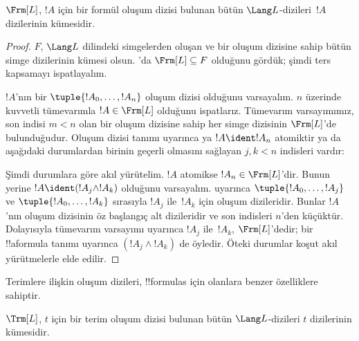 \documentclass[../../../include/open-logic-section]{subfiles}
\begin{document}
\begin{thm}
$\Frm[L]$, $!A$ için bir formül oluşum dizisi bulunan bütün $\Lang
L$-dizileri~$!A$ dizilerinin kümesidir.
\end{thm}

\begin{proof}
$F$, $\Lang L$ dilindeki simgelerden oluşan ve bir oluşum dizisine sahip
bütün simge dizilerinin kümesi olsun. 'da
$\Frm[L] \subseteq F$ olduğunu gördük; şimdi ters kapsamayı ispatlayalım.

$!A$'nın bir $\tuple{!A_0,\dotsc,!A_n}$ oluşum dizisi olduğunu
varsayalım. $n$ üzerinde kuvvetli tümevarımla $!A \in \Frm[L]$ olduğunu
ispatlarız. Tümevarım varsayımımız, son indisi $m < n$ olan bir oluşum
dizisine sahip her simge dizisinin $\Frm[L]$'de bulunduğudur. Oluşum
dizisi tanımı uyarınca ya $!A \ident !A_n$ atomiktir ya da aşağıdaki
durumlardan birinin geçerli olmasını sağlayan $j,k < n$ indisleri vardır:
\begin{enumerate}
\end{enumerate}
Şimdi durumlara göre akıl yürütelim. $!A$ atomikse
$!A_n \in \Frm[L]$'dir. Bunun yerine
$!A \ident (!A_j \land !A_k)$ olduğunu varsayalım.
 uyarınca
$\tuple{!A_0,\dotsc,!A_j}$ ve $\tuple{!A_0,\dotsc,!A_k}$ sırasıyla
$!A_j$ ile~$!A_k$ için oluşum dizileridir. Bunlar $!A$'nın oluşum
dizisinin öz başlangıç alt dizileridir ve son indisleri $n$'den küçüktür.
Dolayısıyla tümevarım varsayımı uyarınca $!A_j$ ile~$!A_k$,
$\Frm[L]$'dedir; bir !!a{formula} tanımı uyarınca
$(!A_j \land !A_k)$ de öyledir. Öteki durumlar koşut akıl yürütmelerle
elde edilir.
\end{proof}

Terimlere ilişkin oluşum dizileri, !!{formula}s için olanlara benzer
özelliklere sahiptir.

\begin{prop}
$\Trm[L]$, $t$ için bir terim oluşum dizisi bulunan bütün $\Lang L$-dizileri
$t$ dizilerinin kümesidir.
\end{prop}
\end{document}
